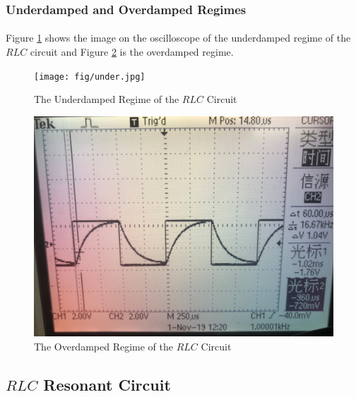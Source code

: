 \documentclass{my_template}
\begin{document}
    \subsubsection{Underdamped and Overdamped Regimes}
    \paragraph{} Figure \ref{fig:RLCunder} shows the image on the oscilloscope of the underdamped regime of the $RLC$ circuit and Figure \ref{fig:RLCover} is the overdamped regime.
    \begin{figure}[H]
        \centering
        \texttt{[image: fig/under.jpg]}
        \caption{The Underdamped Regime of the $RLC$ Circuit}
        \label{fig:RLCunder}
    \end{figure}
    \begin{figure}[H]
        \centering
        \includegraphics[width=\textwidth]{fig/overdamped.jpg}
        \caption{The Overdamped Regime of the $RLC$ Circuit}
        \label{fig:RLCover}
    \end{figure}
    \subsection{$RLC$ Resonant Circuit}\label{sec:RLCResonant}
\end{document}
